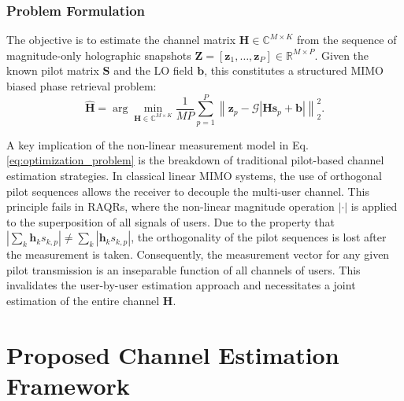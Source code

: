 \documentclass[journal]{IEEEtran}
\begin{document}
\subsubsection{Problem Formulation} The objective is to estimate the channel matrix $\mathbf{H} \in \mathbb{C}^{M \times K}$ from the sequence of magnitude-only holographic snapshots $\mathbf{Z} = [\mathbf{z}_1, \dots, \mathbf{z}_P] \in \mathbb{R}^{M \times P}$. Given the known pilot matrix $\mathbf{S}$ and the LO field $\mathbf{b}$, this constitutes a structured MIMO biased phase retrieval problem:
\begin{equation}
\hat{\mathbf{H}} = \arg\min_{\mathbf{H} \in \mathbb{C}^{M \times K}} \frac{1}{MP} \sum_{p=1}^P \left\| \mathbf{z}_p - \mathcal{G} \left| \mathbf{H}\mathbf{s}_p + \mathbf{b} \right| \right\|_2^2.
\label{eq:optimization_problem}
\end{equation}

A key implication of the non-linear measurement model in Eq. \eqref{eq:optimization_problem} is the breakdown of traditional pilot-based channel estimation strategies. In classical linear MIMO systems, the use of orthogonal pilot sequences allows the receiver to decouple the multi-user channel. This principle fails in RAQRs, where the non-linear magnitude operation $|\cdot|$ is applied to the superposition of all signals of users. Due to the property that $|\sum_k \mathbf{h}_k s_{k,p}| \neq \sum_k |\mathbf{h}_k s_{k,p}|$, the orthogonality of the pilot sequences is lost after the measurement is taken. Consequently, the measurement vector for any given pilot transmission is an inseparable function of all channels of users. This invalidates the user-by-user estimation approach and necessitates a joint estimation of the entire channel $\mathbf{H}$.

\section{Proposed Channel Estimation Framework}
\end{document}
